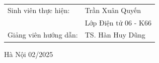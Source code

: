 \begin{titlepage}
\begin{center}
     \begin{table}[H]%
          \centering
          \begin{tabular}{l l}
               \fontsize{14pt}{0pt}\selectfont Sinh viên thực hiện:     
                 
                 &\fontsize{14pt}{0pt}\selectfont Trần Xuân Quyến  \\
                 &\fontsize{14pt}{0pt}\selectfont Lớp Điện tử 06 - K66 \vspace{12pt} \\
               \fontsize{14pt}{0pt}\selectfont Giảng viên hướng dẫn: & \fontsize{14pt}{0pt}\selectfont TS. Hàn Huy Dũng \\   
          \end{tabular}
     \end{table}
     \vspace{3cm} %
     \fontsize{14pt}{0pt}\selectfont Hà Nội 02/2025
     \end{center}
     \end{titlepage}
     
     \cleardoublepage
     
     
